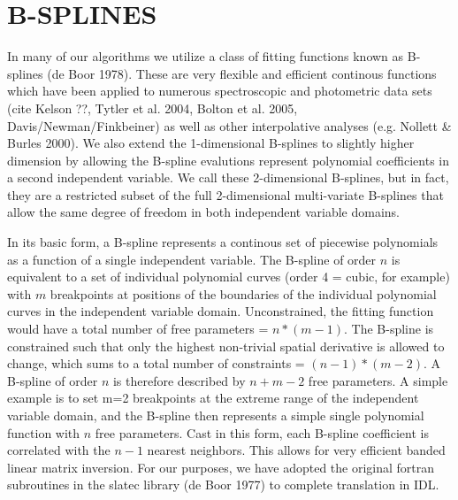 \documentclass[12pt,preprint]{aastex}
\begin{document}
\appendix
\section{B-SPLINES}
\label{bsplines}

In many of our algorithms we utilize a class of fitting functions known
as B-splines (de Boor 1978).  These are very flexible and efficient 
continous functions which have been applied to numerous spectroscopic
and photometric data sets (cite Kelson ??, Tytler et al. 2004, 
Bolton et al. 2005, Davis/Newman/Finkbeiner) as well as other interpolative
analyses (e.g. Nollett \& Burles 2000).  
We also extend the 1-dimensional
B-splines to slightly higher dimension by allowing the B-spline evalutions
represent polynomial coefficients in a second independent variable.  We 
call these 2-dimensional B-splines, but in fact, 
they are a restricted subset of the full 2-dimensional multi-variate B-splines 
that allow the same degree of freedom in both independent variable domains.

In its basic form, a B-spline represents
a continous set of piecewise polynomials as a function of a single independent
variable.  The B-spline of order $n$ is equivalent to a set 
of individual polynomial curves (order 4 = cubic, for example) with $m$ 
breakpoints at positions of the boundaries of the individual polynomial 
curves in the independent variable domain.  Unconstrained, the fitting function
would have a total number of free parameters = $n * (m-1)$.  The B-spline is
constrained such that only the highest non-trivial spatial derivative is
allowed to change, which sums to a total number of constraints = 
$(n-1) * (m-2)$.  A B-spline of order $n$ is therefore described by 
$n + m - 2$ free parameters.  A simple example is to set m=2 breakpoints at
the extreme range of the independent variable domain, and the B-spline then
represents a simple single polynomial function with $n$ free parameters.
Cast in this form, each B-spline coefficient is correlated with the
$n-1$ nearest neighbors.  This allows for very efficient banded linear matrix
inversion.  For our purposes, we have adopted the original fortran subroutines
in the slatec library (de Boor 1977) to complete translation in IDL.

\end{document}
